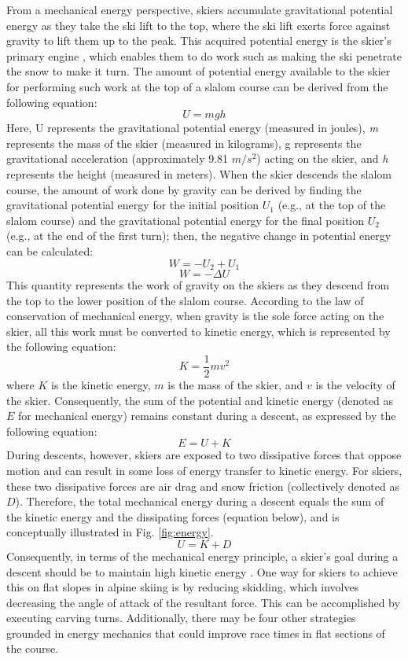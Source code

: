 \documentclass{report}
\begin{document}
From a mechanical energy perspective, skiers accumulate gravitational potential energy as they take the ski lift to the top, where the ski lift exerts force against gravity to lift them up to the peak. This acquired potential energy is the skier's primary engine \cite{supej_differential_2008}, which enables them to do work such as making the ski penetrate the snow to make it turn. The amount of potential energy available to the skier for performing such work at the top of a slalom course can be derived from the following equation:
\[U=mgh\]
Here, U represents the gravitational potential energy (measured in joules), \textit{m} represents the mass of the skier (measured in kilograms), g represents the gravitational acceleration (approximately 9.81 $m/s^2$) acting on the skier, and \textit{h} represents the height (measured in meters). When the skier descends the slalom course, the amount of work done by gravity can be derived by finding the gravitational potential energy for the initial position $U_1$ (e.g., at the top of the slalom course) and the gravitational potential energy for the final position $U_2$ (e.g., at the end of the first turn); then, the negative change in potential energy can be calculated: 
\[W=-U_2 + U_1\]
\[W= -\Delta U \]
This quantity represents the work of gravity on the skiers as they descend from the top to the lower position of the slalom course. According to the law of conservation of mechanical energy, when gravity is the sole force acting on the skier, all this work must be converted to kinetic energy, which is represented by the following equation:
\[ K = \frac{1}{2} m v^2 \]
where $K$ is the kinetic energy, $m$ is the mass of the skier, and $v$ is the velocity of the skier. Consequently, the sum of the potential and kinetic energy  (denoted as $E$ for mechanical energy) remains constant during a descent, as expressed by the following equation:
\[ E = U + K \]
During descents, however, skiers are exposed to two dissipative forces that oppose motion and can result in some loss of energy transfer to kinetic energy. For skiers, these two dissipative forces are air drag and snow friction (collectively denoted as $D$). Therefore, the total mechanical energy during a descent equals the sum of the kinetic energy and the dissipating forces (equation below), and is conceptually illustrated in Fig. \ref{fig:energy}.
\[ U = K + D\]
Consequently, in terms of the mechanical energy principle, a skier's goal during a descent should be to maintain high kinetic energy \cite{supej_differential_2008}. One way for skiers to achieve this on flat slopes in alpine skiing is by reducing skidding\cite{reid_kinematic_2010}, which involves decreasing the angle of attack of the resultant force. This can be accomplished by executing carving turns. Additionally, there may be four other strategies grounded in energy mechanics that could improve race times in flat sections of the course.
\end{document}
